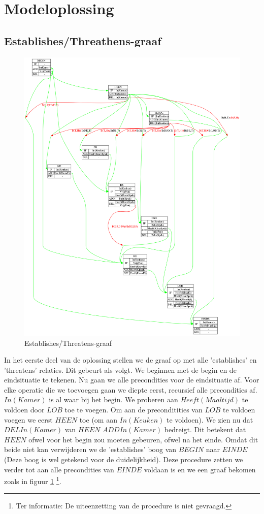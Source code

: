 \documentclass[alternative-exam.tex]{subfiles}
\begin{document}
\section{Modeloplossing}
\subsection{Establishes/Threathens-graaf}
\begin{figure}[p]
\centering
\caption{Establishes/Threatens-graaf}
\label{strips_1}
\includegraphics[scale=0.25]{resources/graphs/strips_1.png}
\end{figure}
In het eerste deel van de oplossing stellen we de graaf op met alle 'establishes' en 'threatens' relaties. Dit gebeurt als volgt. We beginnen met de begin en de eindsituatie te tekenen. Nu gaan we alle precondities voor de eindsituatie af. Voor elke operatie die we toevoegen gaan we diepte eerst, recursief alle precondities af. $In(Kamer)$ is al waar bij het begin. We proberen aan $Heeft(Maaltijd)$ te voldoen door $LOB$ toe te voegen. Om aan de preconditities van $LOB$ te voldoen voegen we eerst $HEEN$ toe (om aan $In(Keuken)$ te voldoen). We zien nu dat $DEL In(Kamer)$ van $HEEN$ $ADD In(Kamer)$ bedreigt. Dit betekent dat $HEEN$ ofwel voor het begin zou moeten gebeuren, ofwel na het einde. Omdat dit beide niet kan verwijderen we de 'establishes' boog van $BEGIN$ naar $EINDE$ (Deze boog is wel getekend voor de duidelijkheid). Deze procedure zetten we verder tot aan alle precondities van $EINDE$ voldaan is en we een graaf bekomen zoals in figuur \ref{strips_1} \footnote{Ter informatie: De uiteenzetting van de procedure is niet gevraagd.}.
\end{document}
